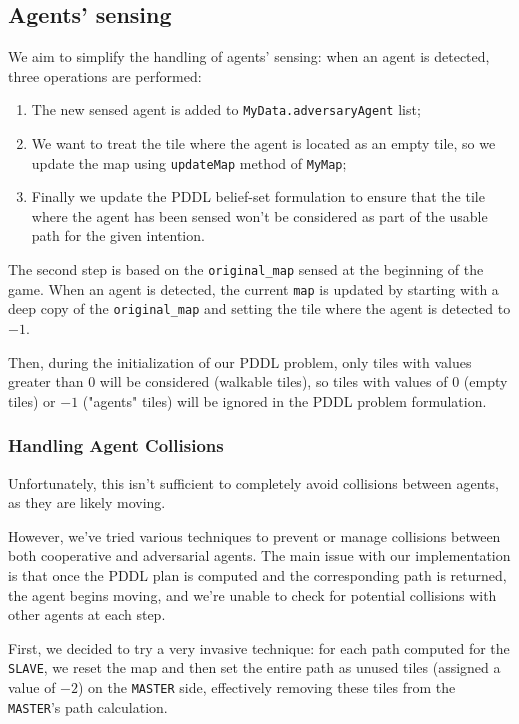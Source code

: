 \documentclass[12pt]{article}
\begin{document}
\subsection{Agents' sensing}
\label{agents}
We aim to simplify the handling of agents' sensing: when an agent is detected, three operations are performed:

\begin{enumerate}
    \item The new sensed agent is added to \texttt{MyData.adversaryAgent} list;
    \item We want to treat the tile where the agent is located as an empty tile, so we update the map using \texttt{updateMap} method of \texttt{MyMap};
    \item Finally we update the PDDL belief-set formulation to ensure that the tile where the agent has been sensed won't be considered as part of the usable path for the given intention.
\end{enumerate}

The second step is based on the \texttt{original\_map} sensed at the beginning of the game. When an agent is detected, the current \texttt{map} is updated by starting with a deep copy of the \texttt{original\_map} and setting the tile where the agent is detected to $-1$. 

Then, during the initialization of our PDDL problem, only tiles with values greater than $0$ will be considered (walkable tiles), so tiles with values of $0$ (empty tiles) or $-1$ ("agents" tiles) will be ignored in the PDDL problem formulation.

\subsubsection{Handling Agent Collisions}

Unfortunately, this isn't sufficient to completely avoid collisions between agents, as they are likely moving.

However, we've tried various techniques to prevent or manage collisions between both cooperative and adversarial agents. The main issue with our implementation is that once the PDDL plan is computed and the corresponding path is returned, the agent begins moving, and we're unable to check for potential collisions with other agents at each step.  

First, we decided to try a very invasive technique: for each path computed for the \texttt{SLAVE}, we reset the map and then set the entire path as unused tiles (assigned a value of $-2$) on the \texttt{MASTER} side, effectively removing these tiles from the \texttt{MASTER}'s path calculation. 
\end{document}

